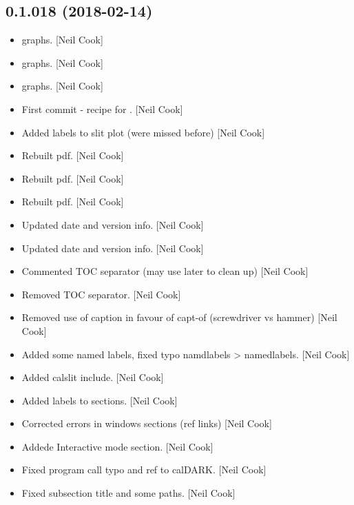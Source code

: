 \documentclass[a4paper,10pt,english]{report}
\begin{document}
\subsection{0.1.018 (2018-02-14)}
\label{\detokenize{misc/changelog:id486}}\begin{itemize}
\item {} 
 graphs. {[}Neil Cook{]}

\item {} 
 graphs. {[}Neil Cook{]}

\item {} 
 graphs. {[}Neil Cook{]}

\item {} 
First commit - recipe for . {[}Neil Cook{]}

\item {} 
Added labels to slit plot (were missed before) {[}Neil Cook{]}

\item {} 
Rebuilt pdf. {[}Neil Cook{]}

\item {} 
Rebuilt pdf. {[}Neil Cook{]}

\item {} 
Rebuilt pdf. {[}Neil Cook{]}

\item {} 
Updated date and version info. {[}Neil Cook{]}

\item {} 
Updated date and version info. {[}Neil Cook{]}

\item {} 
Commented TOC separator (may use later to clean up) {[}Neil Cook{]}

\item {} 
Removed TOC separator. {[}Neil Cook{]}

\item {} 
Removed use of caption in favour of capt-of (screwdriver vs hammer)
{[}Neil Cook{]}

\item {} 
Added some named labels, fixed typo namdlabels \textendash{}\textgreater{} namedlabels. {[}Neil
Cook{]}

\item {} 
Added calslit include. {[}Neil Cook{]}

\item {} 
Added labels to sections. {[}Neil Cook{]}

\item {} 
Corrected errors in windows sections (ref links) {[}Neil Cook{]}

\item {} 
Addede Interactive mode section. {[}Neil Cook{]}

\item {} 
Fixed program call typo and ref to calDARK. {[}Neil Cook{]}

\item {} 
Fixed subsection title and some paths. {[}Neil Cook{]}

\end{itemize}
\end{document}
